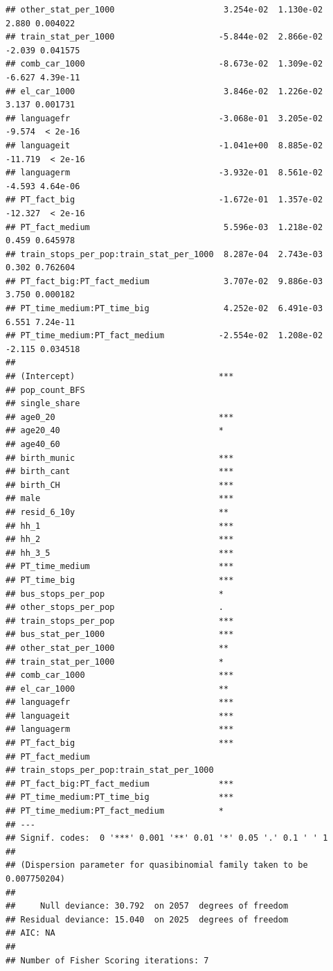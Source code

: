 \documentclass[
]{article}
\begin{document}
\begin{verbatim}
## other_stat_per_1000                      3.254e-02  1.130e-02    2.880 0.004022
## train_stat_per_1000                     -5.844e-02  2.866e-02   -2.039 0.041575
## comb_car_1000                           -8.673e-02  1.309e-02   -6.627 4.39e-11
## el_car_1000                              3.846e-02  1.226e-02    3.137 0.001731
## languagefr                              -3.068e-01  3.205e-02   -9.574  < 2e-16
## languageit                              -1.041e+00  8.885e-02  -11.719  < 2e-16
## languagerm                              -3.932e-01  8.561e-02   -4.593 4.64e-06
## PT_fact_big                             -1.672e-01  1.357e-02  -12.327  < 2e-16
## PT_fact_medium                           5.596e-03  1.218e-02    0.459 0.645978
## train_stops_per_pop:train_stat_per_1000  8.287e-04  2.743e-03    0.302 0.762604
## PT_fact_big:PT_fact_medium               3.707e-02  9.886e-03    3.750 0.000182
## PT_time_medium:PT_time_big               4.252e-02  6.491e-03    6.551 7.24e-11
## PT_time_medium:PT_fact_medium           -2.554e-02  1.208e-02   -2.115 0.034518
##                                            
## (Intercept)                             ***
## pop_count_BFS                              
## single_share                               
## age0_20                                 ***
## age20_40                                *  
## age40_60                                   
## birth_munic                             ***
## birth_cant                              ***
## birth_CH                                ***
## male                                    ***
## resid_6_10y                             ** 
## hh_1                                    ***
## hh_2                                    ***
## hh_3_5                                  ***
## PT_time_medium                          ***
## PT_time_big                             ***
## bus_stops_per_pop                       *  
## other_stops_per_pop                     .  
## train_stops_per_pop                     ***
## bus_stat_per_1000                       ***
## other_stat_per_1000                     ** 
## train_stat_per_1000                     *  
## comb_car_1000                           ***
## el_car_1000                             ** 
## languagefr                              ***
## languageit                              ***
## languagerm                              ***
## PT_fact_big                             ***
## PT_fact_medium                             
## train_stops_per_pop:train_stat_per_1000    
## PT_fact_big:PT_fact_medium              ***
## PT_time_medium:PT_time_big              ***
## PT_time_medium:PT_fact_medium           *  
## ---
## Signif. codes:  0 '***' 0.001 '**' 0.01 '*' 0.05 '.' 0.1 ' ' 1
## 
## (Dispersion parameter for quasibinomial family taken to be 0.007750204)
## 
##     Null deviance: 30.792  on 2057  degrees of freedom
## Residual deviance: 15.040  on 2025  degrees of freedom
## AIC: NA
## 
## Number of Fisher Scoring iterations: 7
\end{verbatim}
\end{document}
